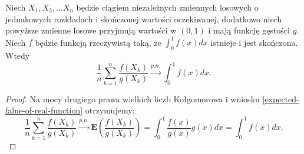 		\begin{tw}
			Niech $X_1, X_2, \ldots X_n$ będzie ciągiem niezależnych zmiennych losowych o jednakowych rozkładach i skończonej wartości oczekiwanej, dodatkowo niech powyższe zmienne losowe przyjmują wartości w $(0,1)$ i mają funkcję gęstości $g$.  Niech $f$ będzie funkcją rzeczywistą taką, że $\int_{0}^{1}f(x)dx$ istnieje i jest skończona. Wtedy
			\begin{equation}
				\frac{1}{n} \sum_{k=1}^{n} \frac{f(X_k)}{g(X_k)}  \stackrel{p.n.}{\longrightarrow} \int_{0}^{1} f(x) dx.
			\end{equation}
		\end{tw}
		\begin{proof}
			Na mocy drugiego prawa wielkich liczb Kołgomorowa i wniosku \ref{expected-falue-of-real-function} otrzymujemy:
			\begin{equation}
			\frac{1}{n} \sum_{k=1}^{n} \frac{f(X_k)}{g(X_k)}  \stackrel{p.n.}{\longrightarrow} \textbf{E}\left( \frac{f(X_k)}{g(X_k)}\right) =
			\int_{0}^{1} \frac{f(x)}{g(x)} g(x)dx = \int_{0}^{1} f(x) dx.
			\end{equation}
		\end{proof}
		